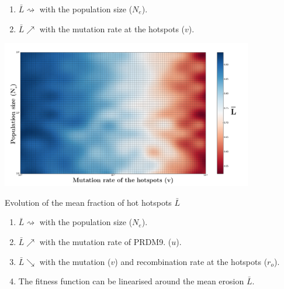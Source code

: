 \documentclass[10pt]{beamer}
\begin{document}
\begin{frame}
	\begin{center}
		\begin{enumerate}
		\item $\bar{L} \rightsquigarrow$ with the population size ($N_e$).
				
		\item $\bar{L} \nearrow$ with the mutation rate at the hotspots ($v$).
	\end{enumerate}
       \includegraphics[width=11cm]{Images/mean-erosion-population-erosion.png}
	\end{center}
\end{frame}


\begin{frame}
	\begin{center}
		\Large
    	Evolution of the mean fraction of hot hotspots $\bar{L}$
	\end{center}
	\begin{enumerate}
			
		\item $\bar{L} \rightsquigarrow$ with the population size ($N_e$).
				
		\item $\bar{L} \nearrow$ with the mutation rate of PRDM9. ($u$).
		
		\item $\bar{L} \searrow$ with the mutation ($v$) and recombination rate at the hotspots ($r_o$).

		\item 	The fitness function can be linearised around the mean erosion $\bar{L}$.
	\end{enumerate}
\end{frame}
\end{document}

